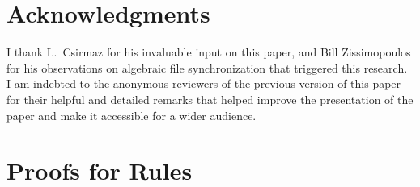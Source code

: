 \documentclass{article}
\begin{document}














\section{Acknowledgments}

I thank L.~Csirmaz for his invaluable input on this paper,
and Bill Zissimopoulos for his observations on algebraic file synchronization that triggered this research.
I am indebted to the anonymous reviewers of the previous version of this paper
for their helpful and detailed remarks
that helped improve the presentation of the paper
and make it accessible for a wider audience.

\begin{thebibliography}{99}



\end{thebibliography}

\appendix %



\section{Proofs for Rules}

\end{document}

